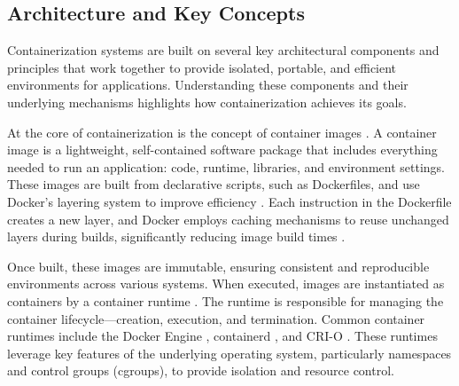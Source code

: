 \subsection{Architecture and Key Concepts}

Containerization systems are built on several key architectural components and
principles that work together to provide isolated, portable, and efficient environments
for applications. Understanding these components and their underlying mechanisms
highlights how containerization achieves its goals.

At the core of containerization is the concept of container images \cite{SystemImage2024}.
A container image is a lightweight, self-contained software package that includes
everything needed to run an application: code, runtime, libraries, and environment
settings. These images are built from declarative scripts, such as Dockerfiles, and
use Docker's layering system to improve efficiency \cite{UnderstandingImageLayers0200}.
Each instruction in the Dockerfile creates a new layer, and Docker employs caching
mechanisms to reuse unchanged layers during builds, significantly reducing image
build times \cite{Cache0200}.

Once built, these images are immutable, ensuring consistent and reproducible
environments across various systems. When executed, images are instantiated as
containers by a container runtime \cite{ContainerRuntimes}. The runtime is responsible
for managing the container lifecycle—creation, execution, and termination. Common
container runtimes include the Docker Engine \cite{DockerEngine0200}, containerd
\cite{Containerd}, and CRI-O \cite{Crio2024}. These runtimes leverage key features
of the underlying operating system, particularly namespaces and control groups
(cgroups), to provide isolation and resource control.

